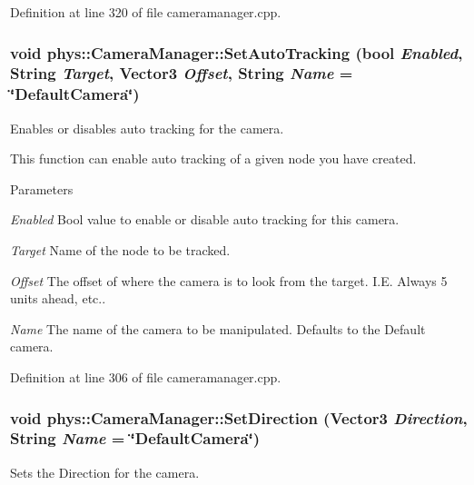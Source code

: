 Definition at line 320 of file cameramanager.cpp.

\hypertarget{classphys_1_1CameraManager_a43d55c71817096add5dad1552239fc74}{
\subsubsection[{SetAutoTracking}]{\setlength{\rightskip}{0pt plus 5cm}void phys::CameraManager::SetAutoTracking (bool {\em Enabled}, \/  {\bf String} {\em Target}, \/  {\bf Vector3} {\em Offset}, \/  {\bf String} {\em Name} = {\ttfamily \char`\"{}DefaultCamera\char`\"{}})}}
\label{d9/d91/classphys_1_1CameraManager_a43d55c71817096add5dad1552239fc74}


Enables or disables auto tracking for the camera. 

This function can enable auto tracking of a given node you have created. 
\begin{DoxyParams}{Parameters}
\item[{\em Enabled}]Bool value to enable or disable auto tracking for this camera. \item[{\em Target}]Name of the node to be tracked. \item[{\em Offset}]The offset of where the camera is to look from the target. I.E. Always 5 units ahead, etc.. \item[{\em Name}]The name of the camera to be manipulated. Defaults to the Default camera. \end{DoxyParams}


Definition at line 306 of file cameramanager.cpp.

\hypertarget{classphys_1_1CameraManager_aaee96e189230c020d6f7b6fe439e0812}{
\subsubsection[{SetDirection}]{\setlength{\rightskip}{0pt plus 5cm}void phys::CameraManager::SetDirection ({\bf Vector3} {\em Direction}, \/  {\bf String} {\em Name} = {\ttfamily \char`\"{}DefaultCamera\char`\"{}})}}
\label{d9/d91/classphys_1_1CameraManager_aaee96e189230c020d6f7b6fe439e0812}


Sets the Direction for the camera. 

